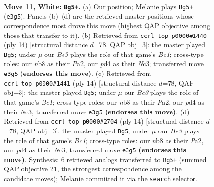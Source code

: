 \documentclass[11pt]{article}
\begin{document}
\clearpage

\begin{figure}[p]\centering
\begin{subfigure}{0.46\textwidth}\centering
\resizebox{\linewidth}{!}{%
\newchessgame
\chessboard[
  setfen={rn1k1bnr/pp3ppp/4p3/1B1pPb2/3p4/N3BN2/P1P2PPP/2R1K2R w K - 2 11},
  showmover=false,
  pgfstyle=straightmove, color=movearrow, markmove={e3-g5}
]}
\caption{}
\end{subfigure}\hfill
\begin{subfigure}{0.46\textwidth}\centering
\resizebox{\linewidth}{!}{%
\newchessgame
\chessboard[
  setfen={rnb4r/ppp1kppp/3b1n2/4p3/2B1P3/2N2N2/PPP2PPP/R1B1K2R w KQ - 4 8},
  showmover=false,
  pgfstyle=straightmove, color=movearrow, markmove={c1-g5}
]}
\caption{}
\end{subfigure}
\\[4pt]
\begin{subfigure}{0.46\textwidth}\centering
\resizebox{\linewidth}{!}{%
\newchessgame
\chessboard[
  setfen={rnb4r/ppp1kppp/3b1n2/4p3/2B1P3/2N2N2/PPP2PPP/R1B1K2R w KQ - 4 8},
  showmover=false,
  pgfstyle=straightmove, color=movearrow, markmove={c1-g5}
]}
\caption{}
\end{subfigure}\hfill
\begin{subfigure}{0.46\textwidth}\centering
\resizebox{\linewidth}{!}{%
\newchessgame
\chessboard[
  setfen={rnb4r/ppp1kppp/3b1n2/4p3/2B1P3/2N2N2/PPP2PPP/R1B1K2R w KQ - 4 8},
  showmover=false,
  pgfstyle=straightmove, color=movearrow, markmove={c1-g5}
]}
\caption{}
\end{subfigure}
\caption{\textbf{Move 11, White: \texttt{Bg5+}.} (a) Our position; Melanie plays \texttt{Bg5+} (\texttt{e3g5}). Panels (b)--(d) are the retrieved master positions whose correspondence most drove this move (highest QAP objective among those that transfer to it). (b) Retrieved from \texttt{ccrl\_top\_p0000\#1440} (ply 14) [structural distance $d$=78, QAP obj=3]: the master played \texttt{Bg5}; under $\mu$ our \emph{Be3} plays the role of that game's \emph{Bc1}; cross-type roles: our \emph{n}b8 as their \emph{P}a2, our \emph{p}d4 as their \emph{N}c3; transferred move \texttt{e3g5} \textbf{(endorses this move)}. (c) Retrieved from \texttt{ccrl\_top\_p0000\#1441} (ply 14) [structural distance $d$=78, QAP obj=3]: the master played \texttt{Bg5}; under $\mu$ our \emph{Be3} plays the role of that game's \emph{Bc1}; cross-type roles: our \emph{n}b8 as their \emph{P}a2, our \emph{p}d4 as their \emph{N}c3; transferred move \texttt{e3g5} \textbf{(endorses this move)}. (d) Retrieved from \texttt{ccrl\_top\_p0000\#2704} (ply 14) [structural distance $d$=78, QAP obj=3]: the master played \texttt{Bg5}; under $\mu$ our \emph{Be3} plays the role of that game's \emph{Bc1}; cross-type roles: our \emph{n}b8 as their \emph{P}a2, our \emph{p}d4 as their \emph{N}c3; transferred move \texttt{e3g5} \textbf{(endorses this move)}. Synthesis: 6 retrieved analogs transferred to \texttt{Bg5+} (summed QAP objective 21, the strongest correspondence among the candidate moves); Melanie committed it via the \texttt{search} selector.}
\label{fig:thought-m20}
\end{figure}
\end{document}
